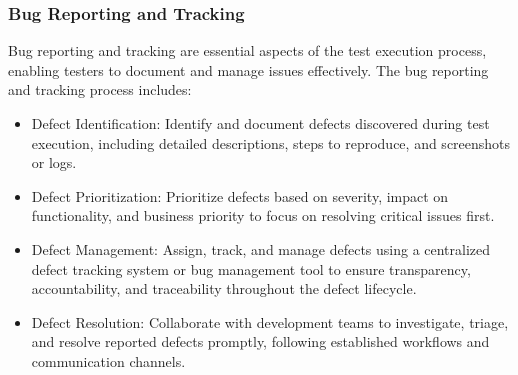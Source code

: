 		\subsubsection{Bug Reporting and Tracking}
		
		Bug reporting and tracking are essential aspects of the test execution process, enabling testers to document and manage issues effectively. The bug reporting and tracking process includes:
		
		\begin{itemize}
			\item Defect Identification: Identify and document defects discovered during test execution, including detailed descriptions, steps to reproduce, and screenshots or logs.
			\item Defect Prioritization: Prioritize defects based on severity, impact on functionality, and business priority to focus on resolving critical issues first.
			\item Defect Management: Assign, track, and manage defects using a centralized defect tracking system or bug management tool to ensure transparency, accountability, and traceability throughout the defect lifecycle.
			\item Defect Resolution: Collaborate with development teams to investigate, triage, and resolve reported defects promptly, following established workflows and communication channels.
		\end{itemize}

		